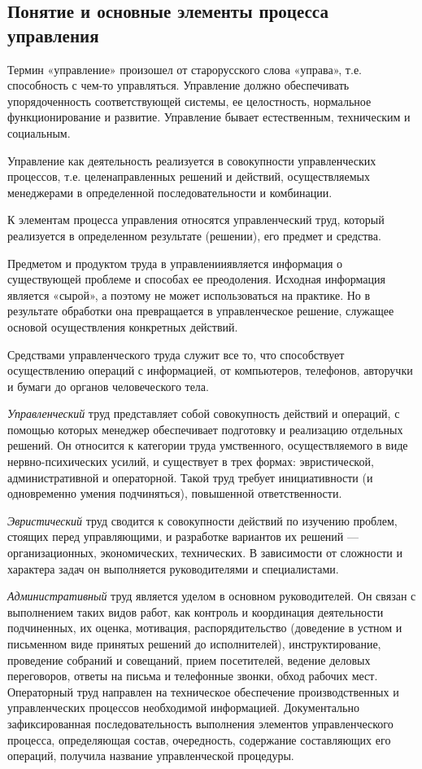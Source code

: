\documentclass[a4paper,12pt,oneside,final]{extarticle}
\numberwithin{equation}{section}
\begin{document}
\subsection{Понятие и основные элементы процесса управления}
Термин «управление» произошел от старорусского слова «управа», т.е. способность с чем-то управляться. 
Управление должно обеспечивать упорядоченность соответствующей системы, ее целостность, нормальное функционирование и развитие. 
Управление бывает естественным, техническим и социальным.

Управление как деятельность реализуется в совокупности управленческих процессов, т.е. целенаправленных решений и действий, осуществляемых менеджерами в определенной последовательности и комбинации.

К элементам процесса управления относятся управленческий труд, который реализуется в определенном результате (решении), его предмет и средства.

Предметом и продуктом труда в управленииявляется информация о существующей проблеме и способах ее преодоления.
Исходная информация является «сырой», а поэтому не может использоваться на практике.
Но в результате обработки она превращается в управленческое решение, служащее основой осуществления конкретных действий.

Средствами управленческого труда служит все то, что способствует осуществлению операций с информацией, от компьютеров, телефонов, авторучки и бумаги до органов человеческого тела.

\textit{Управленческий} труд представляет собой совокупность действий и операций, с помощью которых менеджер обеспечивает подготовку и реализацию отдельных решений.
Он относится к категории труда умственного, осуществляемого в виде нервно-психических усилий, и существует в трех формах: эвристической, административной и операторной. 
Такой труд требует инициативности (и одновременно умения подчиняться), повышенной ответственности.

\textit{Эвристический} труд сводится к совокупности действий по изучению проблем, стоящих перед управляющими, и разработке вариантов их решений --- организационных, экономических, технических. 
В зависимости от сложности и характера за­дач он выполняется руководителями и специалистами.

\textit{Административный} труд является уделом в основном руководителей. 
Он связан с выполнением таких видов работ, как контроль и координация деятельности подчиненных, их оценка, мотивация, распорядительство (доведение в устном и письменном виде принятых решений до исполнителей), инструктирование, проведение собраний и совещаний, прием посетителей, ведение деловых переговоров, ответы на письма и телефонные звонки, обход рабочих мест.
Операторный труд направлен на техническое обеспечение производственных и управленческих процессов необходимой информацией.
Документально зафиксированная последовательность выполнения элементов управленческого процесса, определяющая состав, очередность, содержание составляющих его операций, получила название управленческой процедуры.
\end{document}
